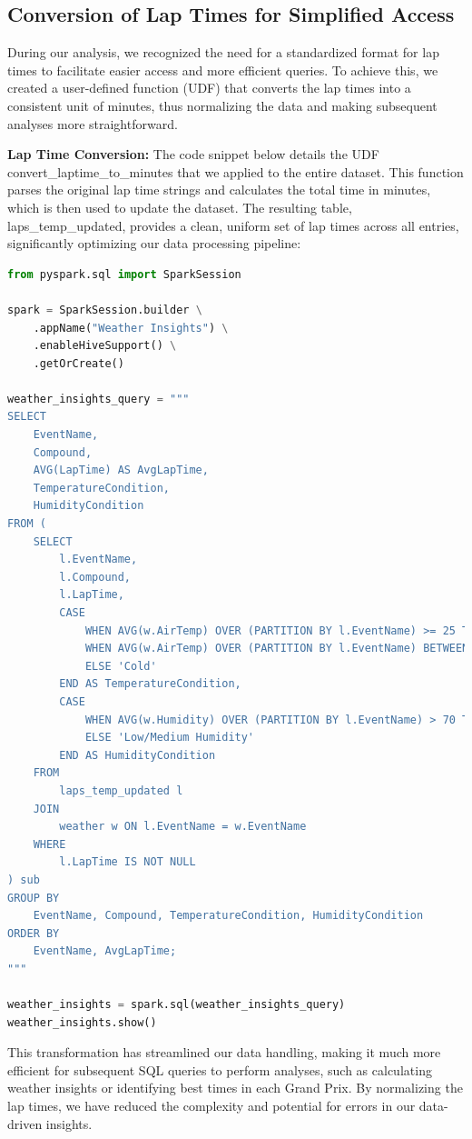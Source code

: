 \documentclass{article}
\begin{document}
\subsection{Conversion of Lap Times for Simplified Access}
During our analysis, we recognized the need for a standardized format for lap times to facilitate easier access and more efficient queries. To achieve this, we created a user-defined function (UDF) that converts the lap times into a consistent unit of minutes, thus normalizing the data and making subsequent analyses more straightforward.

\textbf{Lap Time Conversion:}
The code snippet below details the UDF convert\_laptime\_to\_minutes that we applied to the entire dataset. This function parses the original lap time strings and calculates the total time in minutes, which is then used to update the dataset. The resulting table, laps\_temp\_updated, provides a clean, uniform set of lap times across all entries, significantly optimizing our data processing pipeline:

\begin{lstlisting}[language=Python]
from pyspark.sql import SparkSession

spark = SparkSession.builder \
    .appName("Weather Insights") \
    .enableHiveSupport() \
    .getOrCreate()

weather_insights_query = """
SELECT
    EventName,
    Compound,
    AVG(LapTime) AS AvgLapTime,
    TemperatureCondition,
    HumidityCondition
FROM (
    SELECT
        l.EventName,
        l.Compound,
        l.LapTime,
        CASE
            WHEN AVG(w.AirTemp) OVER (PARTITION BY l.EventName) >= 25 THEN 'Hot'
            WHEN AVG(w.AirTemp) OVER (PARTITION BY l.EventName) BETWEEN 15 AND 24 THEN 'Mild'
            ELSE 'Cold'
        END AS TemperatureCondition,
        CASE
            WHEN AVG(w.Humidity) OVER (PARTITION BY l.EventName) > 70 THEN 'High Humidity'
            ELSE 'Low/Medium Humidity'
        END AS HumidityCondition
    FROM
        laps_temp_updated l
    JOIN
        weather w ON l.EventName = w.EventName
    WHERE
        l.LapTime IS NOT NULL  
) sub
GROUP BY
    EventName, Compound, TemperatureCondition, HumidityCondition
ORDER BY
    EventName, AvgLapTime;
"""

weather_insights = spark.sql(weather_insights_query)
weather_insights.show()

\end{lstlisting}
This transformation has streamlined our data handling, making it much more efficient for subsequent SQL queries to perform analyses, such as calculating weather insights or identifying best times in each Grand Prix. By normalizing the lap times, we have reduced the complexity and potential for errors in our data-driven insights.
\end{document}
